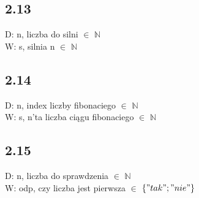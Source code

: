 \documentclass[a4paper,twoside,7pt]{book}
\begin{document}
\subsection*{2.13}
\begin{multicols}{2}
  \begin{flushleft}
  
D: n, liczba do silni $\in$ $\mathbb{N}$\\
W: s, silnia n $\in$ $\mathbb{N}$

    \end{flushleft}

    \begin{flushright}
    
    \end{flushright}    
\end{multicols}

\subsection*{2.14}
\begin{multicols}{2}
  \begin{flushleft}

D: n, index liczby fibonaciego $\in$ $\mathbb{N}$\\
W: s, n'ta liczba ciągu fibonaciego $\in$ $\mathbb{N}$
\end{flushleft}
\begin{minipage}{3cm}
   
\end{minipage}
\begin{flushright}
\end{flushright}    
\end{multicols}
\hspace{3cm}
\begin{minipage}{3cm}
  
\end{minipage}

    


\newpage
\subsection*{2.15}
\begin{multicols}{2}
  \begin{flushleft}


D: n, liczba do sprawdzenia $\in$ $\mathbb{N}$\\
W: odp, czy liczba jest pierwsza $\in$ $\{"tak";"nie"\}$

\hspace{0.4cm}
\begin{minipage}{3cm}
\vspace{0.6cm}
\small

\normalsize

\end{minipage}

    \end{flushleft}

    \begin{flushright}
    
   
    \end{flushright}    
\end{multicols}
\end{document}
